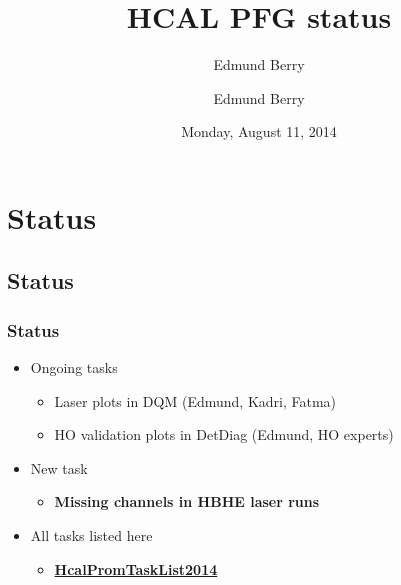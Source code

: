 \documentclass[bigger]{beamer}
\title{HCAL PFG status}
\author{Edmund Berry}
\date{Monday, August 11, 2014}
\author[Edmund Berry]{\alert{Edmund Berry}}
\providecommand{\alert}[1]{\textbf{#1}}
\begin{document}
\maketitle


\section{Status}
\label{sec-1}
\subsection{Status}
\label{sec-1-1}
\begin{frame}
\frametitle{Status}
\label{sec-1-1-1}
\begin{itemize}

\item Ongoing tasks
\label{sec-1-1-1-1}%
\begin{itemize}

\item Laser plots in DQM (Edmund, Kadri, Fatma)
\label{sec-1-1-1-1-1}%

\item HO validation plots in DetDiag (Edmund, HO experts)
\label{sec-1-1-1-1-2}%
\end{itemize} %

\item New task
\label{sec-1-1-1-2}%
\begin{itemize}

\item \alert{Missing channels in HBHE laser runs}
\label{sec-1-1-1-2-1}%
\end{itemize} %

\item All tasks listed here
\label{sec-1-1-1-3}%
\begin{itemize}

\item \href{https://twiki.cern.ch/twiki/bin/viewauth/CMS/HcalPromTaskList2014}{\alert{HcalPromTaskList2014}}
\label{sec-1-1-1-3-1}%
\end{itemize} %
\end{itemize} %
\end{frame}
\end{document}
